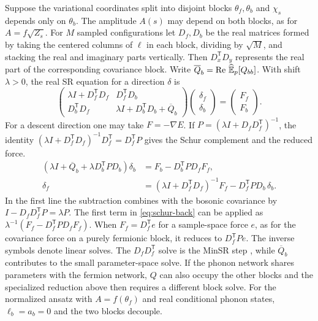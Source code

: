 \documentclass[../../main.tex]{subfiles}
\begin{document}
Suppose the variational coordinates split into disjoint blocks
\(\theta_f,\theta_b\) and \(\chi_s\) depends only on \(\theta_b\).
The amplitude \(A(s)\) may depend on both blocks, as for
\(A=f\sqrt{Z_s}\). For \(M\) sampled configurations let \(D_f,D_b\)
be the real matrices formed by taking the centered columns of \(\ell\)
in each block, dividing by \(\sqrt M\), and stacking the real and
imaginary parts vertically. Then \(D_x^{\mathsf T}D_y\) represents the
real part of the corresponding covariance block. Write
\(\overline Q_b=\operatorname{Re}\,\widehat{\mathbb{E}}_p[Q_{bb}]\). With shift
\(\lambda>0\), the real SR equation for a direction \(\delta\) is
\begin{equation}
 \begin{pmatrix}
      \lambda I+D_f^{\mathsf T}D_f & D_f^{\mathsf T}D_b\\
      D_b^{\mathsf T}D_f & \lambda I+D_b^{\mathsf T}D_b+\overline Q_b
 \end{pmatrix}
 \begin{pmatrix}\delta_f\\\delta_b\end{pmatrix}
 =\begin{pmatrix}F_f\\F_b\end{pmatrix}.
 \label{eq:sr-block}
\end{equation}
For a descent direction one may take \(F=-\nabla E\).
If \(P=(\lambda I+D_f D_f^{\mathsf T})^{-1}\), the identity
\((\lambda I+D_f^{\mathsf T}D_f)^{-1}D_f^{\mathsf T}=D_f^{\mathsf T}P\)
gives the Schur complement and the reduced force.
\begin{align}
 (\lambda I+\overline Q_b+\lambda D_b^{\mathsf T}P D_b)\delta_b
       &=F_b-D_b^{\mathsf T}P D_f F_f,\label{eq:schur}\\
 \delta_f&=(\lambda I+D_f^{\mathsf T}D_f)^{-1}F_f
                 -D_f^{\mathsf T}P D_b\,\delta_b .
 \label{eq:schur-back}
\end{align}
In the first line the subtraction combines with the bosonic covariance
by \(I-D_f D_f^{\mathsf T}P=\lambda P\).
The first term in \cref{eq:schur-back} can be applied as
\(\lambda^{-1}(F_f-D_f^{\mathsf T}P D_f F_f)\). When
\(F_f=D_f^{\mathsf T}e\) for a sample-space force \(e\), as for the
covariance force on a purely fermionic block, it reduces to
\(D_f^{\mathsf T}Pe\). The inverse symbols denote linear solves.
The \(D_fD_f^{\mathsf T}\) solve is the MinSR step
\cite{chen2024}, while \(\overline Q_b\) contributes to the small
parameter-space solve. If the phonon network shares parameters with
the fermion network, \(Q\) can also occupy the other blocks and the
specialized reduction above then requires a different block solve.
For the normalized ansatz with \(A=f(\theta_f)\) and real conditional
phonon states, \(\ell_b=a_b=0\) and the two blocks decouple.
\end{document}
